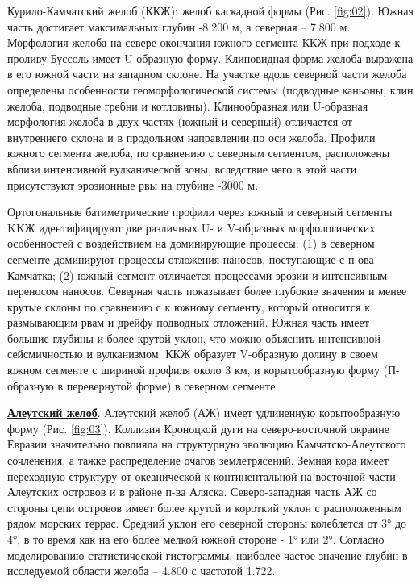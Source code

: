 Курило-Камчатский желоб (ККЖ): желоб каскадной формы (Рис. \ref{fig:02}). Южная часть достигает максимальных глубин -8.200 м, а северная – 7.800 м. Морфология желоба на севере окончания южного сегмента ККЖ при подходе к проливу Буссоль имеет U-образную форму. Клиновидная форма желоба выражена в его южной части на западном склоне. На участке вдоль северной части желоба определены особенности геоморфологической системы (подводные каньоны, клин желоба, подводные гребни и котловины). Клинообразная или U-образная морфология желоба в двух частях (южный и северный) отличается от внутреннего склона и в продольном направлении по оси желоба. Профили южного сегмента желоба, по сравнению с северным сегментом, расположены вблизи интенсивной вулканической зоны, вследствие чего в этой части присутствуют эрозионные рвы на глубине -3000 м. 

Ортогональные батиметрические профили через южный и северный сегменты KKЖ идентифицируют две различных U- и V-образных морфологических особенностей с воздействием на доминирующие процессы: (1) в северном сегменте доминируют процессы отложения наносов, поступающие с п-ова Камчатка; (2) южный сегмент отличается процессами эрозии и интенсивным переносом наносов. Северная часть показывает более глубокие значения и менее крутые склоны по сравнению с к южному сегменту, который относится к размывающим рвам и дрейфу подводных отложений. Южная часть имеет большие глубины и более крутой уклон, что можно объяснить интенсивной сейсмичностью и вулканизмом. ККЖ образует V-образную долину в своем южном сегменте с шириной профиля около 3 км, и корытообразную форму (П-образную в перевернутой форме) в северном сегменте.

\underline{\textbf{Алеутский желоб}}. Алеутский желоб (АЖ) имеет удлиненную корытообразную форму (Рис. \ref{fig:03}). Коллизия Кроноцкой дуги на северо-восточной окраине Евразии значительно повлияла на структурную эволюцию Камчатско-Алеутского сочленения, а тажке распределение очагов землетрясений. Земная кора имеет переходную структуру от океанической к континентальной на восточной части Алеутских островов и в районе п-ва Аляска. Северо-западная часть АЖ со стороны цепи островов имеет более крутой и короткий уклон с расположенным рядом морских террас. Средний уклон его северной стороны колеблется от 3° до 4°, в то время как на его более мелкой южной стороне - 1° или 2°. Согласно моделированию статистической гистограммы, наиболее частое значение глубин в исследуемой области желоба – 4.800 с частотой 1.722. 

